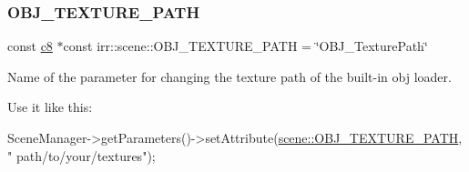 \subsubsection{\texorpdfstring{O\+B\+J\+\_\+\+T\+E\+X\+T\+U\+R\+E\+\_\+\+P\+A\+TH}{OBJ\_TEXTURE\_PATH}}
{\footnotesize\ttfamily const \hyperlink{namespaceirr_a9395eaea339bcb546b319e9c96bf7410}{c8} $\ast$const irr\+::scene\+::\+O\+B\+J\+\_\+\+T\+E\+X\+T\+U\+R\+E\+\_\+\+P\+A\+TH = \char`\"{}O\+B\+J\+\_\+\+Texture\+Path\char`\"{}}



Name of the parameter for changing the texture path of the built-\/in obj loader. 

Use it like this\+: 
\begin{DoxyCode}
SceneManager->getParameters()->setAttribute(\hyperlink{namespaceirr_1_1scene_a9f673de5be36d1ea444d8a0c0861ca05}{scene::OBJ\_TEXTURE\_PATH}, \textcolor{stringliteral}{"
      path/to/your/textures"});
\end{DoxyCode}
 